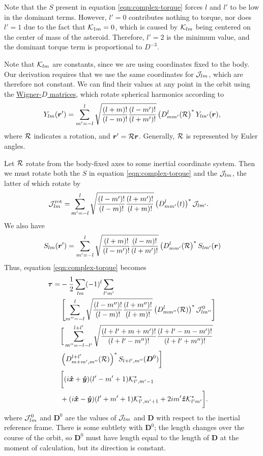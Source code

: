 \documentclass[aps,twocolumn,secnumarabic,balancelastpage,amsmath,amssymb,nofootinbib,floatfix]{revtex4-1}
\begin{document}
Note that the $S$ present in equation \ref{eqn:complex-torque} forces $l$ and $l'$ to be low in the dominant terms. However, $l'=0$ contributes nothing to torque, nor does $l'=1$ due to the fact that $\mathcal{K}_{1m}=0$, which is caused by $\mathcal{K}_{lm}$ being centered on the center of mass of the asteroid. Therefore, $l'=2$ is the minimum value, and the dominant torque term is proportional to $D^{-3}$.

Note that $\mathcal{K}_{lm}$ are constants, since we are using coordinates fixed to the body. Our derivation requires that we use the same coordinates for $\mathcal{J}_{lm}$, which are therefore not constant. We can find their values at any point in the orbit using the \href{https://en.wikipedia.org/wiki/Wigner_D-matrix#Relation_to_spherical_harmonics_and_Legendre_polynomials}{Wigner-$D$ matrices}, which rotate spherical harmonics according to
$$Y_{lm}(\bm r') = \sum_{m'=-l}^l\sqrt{\frac{(l+m)!}{(l-m)!}\frac{(l-m')!}{(l+m')!}}\left( D^l_{mm'}(\mathcal{R} \right)^*Y_{lm'}(\bm r),$$
where $\mathcal{R}$ indicates a rotation, and $\bm r' = \mathcal{R} \bm r$. Generally, $\mathcal{R}$ is represented by Euler angles.

Let $\mathcal{R}$ rotate from the body-fixed axes to some inertial coordinate system. Then we must rotate both the $S$ in equation \ref{eqn:complex-torque} and the $\mathcal{J}_{lm}$, the latter of which rotate by
\begin{equation*}
\begin{aligned}
\mathcal{J}^\text{rot}_{lm} =&\sum_{m'=-l}^l\sqrt{\frac{(l-m')!}{(l-m)!}\frac{(l+m')!}{(l+m)!}}\left( D^l_{mm'}(t) \right)^*\mathcal{J}_{lm'}.
\end{aligned}
\end{equation*}
We also have
$$S_{lm}(\bm r') = \sum_{m'=-l}^l \sqrt{\frac{(l+m)!}{(l-m')!} \frac{(l-m)!}{(l+m')!}} \left( D^l_{mm'}(\mathcal{R} \right)^*S_{lm'}(\bm r)$$
Thus, equation \ref{eqn:complex-torque} becomes
\begin{equation*}
\begin{aligned}
\bm \tau = &-\frac{1}{2}\sum_{lm}(-1)^l\sum_{l'm'}\\
&\left[ \sum_{m''=-l}^l\sqrt{\frac{(l-m'')!}{(l-m)!}\frac{(l+m'')!}{(l+m)!}}\left( D^l_{mm''}(\mathcal{R}) \right)^*\mathcal{J}_{lm''}^0 \right]\\
&\bigg[\sum_{m''=-l-l'}^{l+l'} \sqrt{\frac{(l+l'+m+m')!}{(l+l'-m'')!}\frac{(l+l'-m-m')!}{(l+l'+m'')!}}\\
&\left( D^{l+l'}_{m+m',m''}(\mathcal{R}) \right)^*S_{l+l',m''}(\bm D^0)\bigg]\\
&\bigg[(i\bm{\hat x} + \bm{\hat y})(l'-m'+1)\mathcal{K}^*_{l',m'-1}\\
&+(i\bm{\hat x}-\bm{\hat y})(l'+m'+1)\mathcal{K}^*_{l',m'+1}+2im'\bm{\hat z} \mathcal{K}^*_{l'm'}\bigg].
\end{aligned}
\end{equation*}
where $\mathcal{J}_{lm}^0$ and $\bm D^0$ are the values of $\mathcal{J}_{lm}$ and $\bm D$ with respect to the inertial reference frame. There is some subtlety with $\bm D^0$; the length changes over the course of the orbit, so $\bm D^0$ must have length equal to the length of $\bm D$ at the moment of calculation, but its direction is constant.
\end{document}
